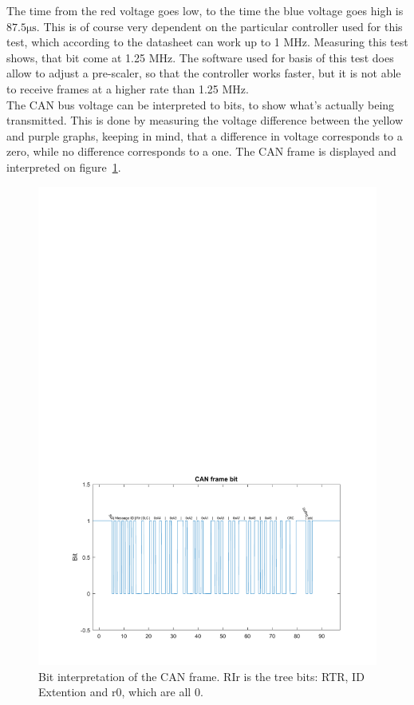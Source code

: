 The time from the red voltage goes low, to the time the blue voltage goes high is $87.5 \si{\micro\second}$.
This is of course very dependent on the particular controller used for this test, which according to the datasheet can work up to 1 MHz.
Measuring this test shows, that bit come at 1.25 MHz.
The software used for basis of this test does allow to adjust a pre-scaler, so that the controller works faster, but it is not able to receive frames at a higher rate than 1.25 MHz.\\

The CAN bus voltage can be interpreted to bits, to show what's actually being transmitted.
This is done by measuring the voltage difference between the yellow and purple graphs, keeping in mind, that a difference in voltage corresponds to a zero, while no difference corresponds to a one.
The CAN frame is displayed and interpreted on figure~\ref{fig:CAN_test1_message}.\\

\begin{figure}[h]
	\centering
	\includegraphics[width = \linewidth]{graphics/CAN_test1_message}
	\caption{Bit interpretation of the CAN frame. RIr  is the tree bits: RTR, ID Extention and r0, which are all 0.}
	\label{fig:CAN_test1_message}
\end{figure}

